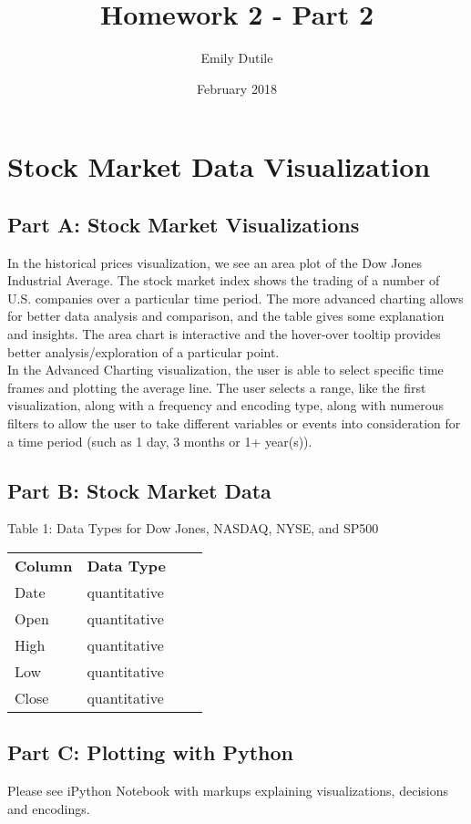\documentclass{neu_handout}
\title{Homework 2 - Part 2}
\author{Emily Dutile}
\date{February 2018}
\begin{document}
\section*{Stock Market Data Visualization}

\subsection*{Part A: Stock Market Visualizations}
In the historical prices visualization, we see an area plot of the Dow Jones Industrial Average. The stock market index shows the trading of a number of U.S. companies over a particular time period. The more advanced charting allows for better data analysis and comparison, and the table gives some explanation and insights. The area chart is interactive and the hover-over tooltip provides better analysis/exploration of a particular point.\\

In the Advanced Charting visualization, the user is able to select specific time frames and plotting the average line. The user selects a range, like the first visualization, along with a frequency and encoding type, along with numerous filters to allow the user to take different variables or events into consideration for a time period (such as 1 day, 3 months or 1+ year(s)).

\subsection*{Part B: Stock Market Data}

\begin{center}
Table 1: Data Types for Dow Jones, NASDAQ, NYSE, and SP500
\end{center}
\begin{center} 
\begin{tabular}[h]{l l l l}
\textbf{Column} & \textbf{Data Type} \\
Date & quantitative \\
Open & quantitative \\ 
High & quantitative \\
Low & quantitative \\
Close & quantitative \\

\end{tabular}
\end{center}

\subsection*{Part C: Plotting with Python}
Please see iPython Notebook with markups explaining visualizations, decisions and encodings.
\end{document}

